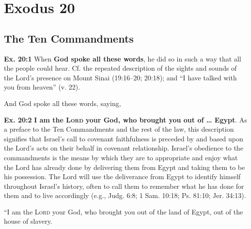 \documentclass{bible-study-handout}
\begin{document}
\newpage
\section{Exodus 20}

\subsection{The Ten Commandments}

\begin{studycomment}\textbf{Ex. 20:1} When \textbf{God spoke all these words}, he did so in such a way that all the people could hear. Cf. the repeated description of the sights and sounds of the Lord’s presence on Mount Sinai (19:16–20; 20:18); and “I have talked with you from heaven” (v. 22).\end{studycomment}And God spoke all these words, saying,

\begin{studycomment}\textbf{Ex. 20:2} \textbf{I am the \textsc{Lord}} \textbf{your God, who brought you out of … Egypt}. As a preface to the Ten Commandments and the rest of the law, this description signifies that Israel’s call to covenant faithfulness is preceded by and based upon the Lord’s acts on their behalf in covenant relationship. Israel’s obedience to the commandments is the means by which they are to appropriate and enjoy what the Lord has already done by delivering them from Egypt and taking them to be his possession. The Lord will use the deliverance from Egypt to identify himself throughout Israel’s history, often to call them to remember what he has done for them and to live accordingly (e.g., Judg. 6:8; 1 Sam. 10:18; Ps. 81:10; Jer. 34:13).\end{studycomment}“I am the \textsc{Lord} your God, who brought you out of the land of Egypt, out of the house of slavery.
\end{document}
